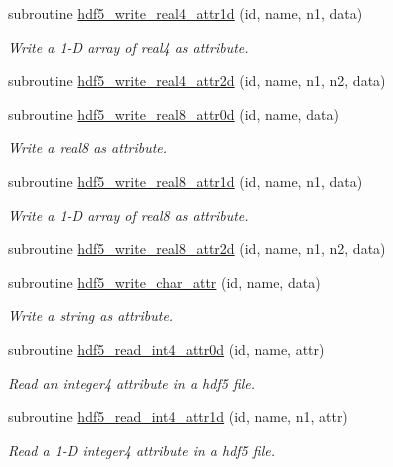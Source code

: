 \begin{DoxyCompactItemize}
subroutine \hyperlink{classmodhdf5_a6158884984b6690aad27d75c6d5f58a7}{hdf5\-\_\-write\-\_\-real4\-\_\-attr1d} (id, name, n1, data)
\begin{DoxyCompactList}\small\item\em Write a 1-\/\-D array of real4 as attribute. \end{DoxyCompactList}\item 
subroutine \hyperlink{classmodhdf5_ad682a858bcaec8fcd21f646d44d76208}{hdf5\-\_\-write\-\_\-real4\-\_\-attr2d} (id, name, n1, n2, data)
\item 
subroutine \hyperlink{classmodhdf5_a28db26cc0b827091ab455d2419c88b10}{hdf5\-\_\-write\-\_\-real8\-\_\-attr0d} (id, name, data)
\begin{DoxyCompactList}\small\item\em Write a real8 as attribute. \end{DoxyCompactList}\item 
subroutine \hyperlink{classmodhdf5_ad55b7cffc861305840d5f160ba6fa1fd}{hdf5\-\_\-write\-\_\-real8\-\_\-attr1d} (id, name, n1, data)
\begin{DoxyCompactList}\small\item\em Write a 1-\/\-D array of real8 as attribute. \end{DoxyCompactList}\item 
subroutine \hyperlink{classmodhdf5_a71ef9213132fb3f757d29f58f9c20966}{hdf5\-\_\-write\-\_\-real8\-\_\-attr2d} (id, name, n1, n2, data)
\item 
subroutine \hyperlink{classmodhdf5_ad6fea34611cf76b56b5143cd182b8484}{hdf5\-\_\-write\-\_\-char\-\_\-attr} (id, name, data)
\begin{DoxyCompactList}\small\item\em Write a string as attribute. \end{DoxyCompactList}\item 
subroutine \hyperlink{classmodhdf5_a10a4b5212d77e52dba2616ba3abb7df1}{hdf5\-\_\-read\-\_\-int4\-\_\-attr0d} (id, name, attr)
\begin{DoxyCompactList}\small\item\em Read an integer4 attribute in a hdf5 file. \end{DoxyCompactList}\item 
subroutine \hyperlink{classmodhdf5_a2ff1b28dd896cc37583e97a52348039f}{hdf5\-\_\-read\-\_\-int4\-\_\-attr1d} (id, name, n1, attr)
\begin{DoxyCompactList}\small\item\em Read a 1-\/\-D integer4 attribute in a hdf5 file. \end{DoxyCompactList}\item 

\end{DoxyCompactItemize}
